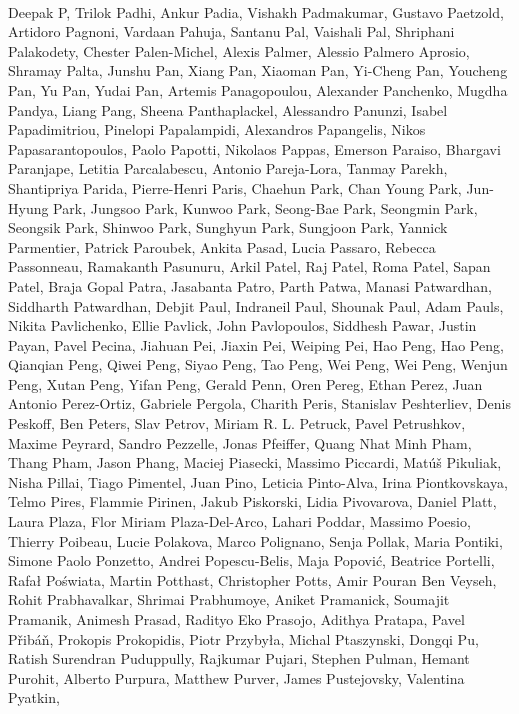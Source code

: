 \paragraph{}Deepak P, Trilok Padhi, Ankur Padia, Vishakh Padmakumar, Gustavo Paetzold, Artidoro Pagnoni, Vardaan Pahuja, Santanu Pal, Vaishali Pal, Shriphani Palakodety, Chester Palen-Michel, Alexis Palmer, Alessio Palmero Aprosio, Shramay Palta, Junshu Pan, Xiang Pan, Xiaoman Pan, Yi-Cheng Pan, Youcheng Pan, Yu Pan, Yudai Pan, Artemis Panagopoulou, Alexander Panchenko, Mugdha Pandya, Liang Pang, Sheena Panthaplackel, Alessandro Panunzi, Isabel Papadimitriou, Pinelopi Papalampidi, Alexandros Papangelis, Nikos Papasarantopoulos, Paolo Papotti, Nikolaos Pappas, Emerson Paraiso, Bhargavi Paranjape, Letitia Parcalabescu, Antonio Pareja-Lora, Tanmay Parekh, Shantipriya Parida, Pierre-Henri Paris, Chaehun Park, Chan Young Park, Jun-Hyung Park, Jungsoo Park, Kunwoo Park, Seong-Bae Park, Seongmin Park, Seongsik Park, Shinwoo Park, Sunghyun Park, Sungjoon Park, Yannick Parmentier, Patrick Paroubek, Ankita Pasad, Lucia Passaro, Rebecca Passonneau, Ramakanth Pasunuru, Arkil Patel, Raj Patel, Roma Patel, Sapan Patel, Braja Gopal Patra, Jasabanta Patro, Parth Patwa, Manasi Patwardhan, Siddharth Patwardhan, Debjit Paul, Indraneil Paul, Shounak Paul, Adam Pauls, Nikita Pavlichenko, Ellie Pavlick, John Pavlopoulos, Siddhesh Pawar, Justin Payan, Pavel Pecina, Jiahuan Pei, Jiaxin Pei, Weiping Pei, Hao Peng, Hao Peng, Qianqian Peng, Qiwei Peng, Siyao Peng, Tao Peng, Wei Peng, Wei Peng, Wenjun Peng, Xutan Peng, Yifan Peng, Gerald Penn, Oren Pereg, Ethan Perez, Juan Antonio Perez-Ortiz, Gabriele Pergola, Charith Peris, Stanislav Peshterliev, Denis Peskoff, Ben Peters, Slav Petrov, Miriam R. L. Petruck, Pavel Petrushkov, Maxime Peyrard, Sandro Pezzelle, Jonas Pfeiffer, Quang Nhat Minh Pham, Thang Pham, Jason Phang, Maciej Piasecki, Massimo Piccardi, Matúš Pikuliak, Nisha Pillai, Tiago Pimentel, Juan Pino, Leticia Pinto-Alva, Irina Piontkovskaya, Telmo Pires, Flammie Pirinen, Jakub Piskorski, Lidia Pivovarova, Daniel Platt, Laura Plaza, Flor Miriam Plaza-Del-Arco, Lahari Poddar, Massimo Poesio, Thierry Poibeau, Lucie Polakova, Marco Polignano, Senja Pollak, Maria Pontiki, Simone Paolo Ponzetto, Andrei Popescu-Belis, Maja Popović, Beatrice Portelli, Rafał Poświata, Martin Potthast, Christopher Potts, Amir Pouran Ben Veyseh, Rohit Prabhavalkar, Shrimai Prabhumoye, Aniket Pramanick, Soumajit Pramanik, Animesh Prasad, Radityo Eko Prasojo, Adithya Pratapa, Pavel Přibáň, Prokopis Prokopidis, Piotr Przybyła, Michal Ptaszynski, Dongqi Pu, Ratish Surendran Puduppully, Rajkumar Pujari, Stephen Pulman, Hemant Purohit, Alberto Purpura, Matthew Purver, James Pustejovsky, Valentina Pyatkin,
